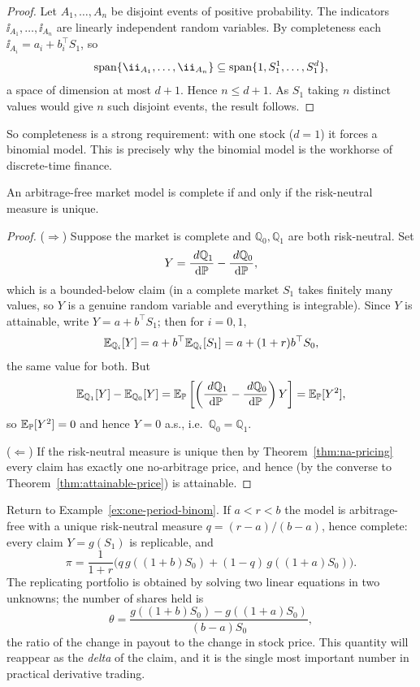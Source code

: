 \documentclass[a4paper]{scrartcl}
\newcommand{\QQ}{\mathbb{Q}}
\newcommand{\dP}{\mathrm{d}\PP}
\begin{document}
\begin{proof}
	Let $A_1,\dots,A_n$ be disjoint events of positive probability. The indicators $\ii_{A_1},\dots,\ii_{A_n}$ are linearly independent random variables. By completeness each $\ii_{A_i} = a_i + b_i^\top S_1$, so
	$$
	\vecspan\{\ii_{A_1},\dots,\ii_{A_n}\} \subseteq \vecspan\{1, S_1^1,\dots,S_1^d\},
	$$
	a space of dimension at most $d+1$. Hence $n \leq d+1$. As $S_1$ taking $n$ distinct values would give $n$ such disjoint events, the result follows.
\end{proof}

So completeness is a strong requirement: with one stock ($d=1$) it forces a binomial model. This is precisely why the binomial model is the workhorse of discrete-time finance.

\begin{theorem}\label{thm:ftap2}
	An arbitrage-free market model is complete if and only if the risk-neutral measure is unique.
\end{theorem}

\begin{proof}
	($\Rightarrow$) Suppose the market is complete and $\QQ_0, \QQ_1$ are both risk-neutral. Set
	$$
	Y = \frac{\dd\QQ_1}{\dP} - \frac{\dd\QQ_0}{\dP},
	$$
	which is a bounded-below claim (in a complete market $S_1$ takes finitely many values, so $Y$ is a genuine random variable and everything is integrable). Since $Y$ is attainable, write $Y = a + b^\top S_1$; then for $i = 0,1$,
	$$
	\EE_{\QQ_i}[Y] = a + b^\top\EE_{\QQ_i}[S_1] = a + (1+r)b^\top S_0,
	$$
	the same value for both. But
	$$
	\EE_{\QQ_1}[Y] - \EE_{\QQ_0}[Y] = \EE_\PP\left[\left(\frac{\dd \QQ_1}{\dP} - \frac{\dd\QQ_0}{\dP}\right)Y\right] = \EE_\PP[Y^2],
	$$
	so $\mathbb{E}_{\mathbb{P}}[Y^2] = 0$ and hence $Y = 0$ a.s., i.e.\ $\QQ_0 = \QQ_1$.

	($\Leftarrow$) If the risk-neutral measure is unique then by Theorem~\ref{thm:na-pricing} every claim has exactly one no-arbitrage price, and hence (by the converse to Theorem~\ref{thm:attainable-price}) is attainable.
\end{proof}

\begin{example}
	Return to Example~\ref{ex:one-period-binom}. If $a < r < b$ the model is arbitrage-free with a unique risk-neutral measure $q = (r-a)/(b-a)$, hence complete: every claim $Y = g(S_1)$ is replicable, and
	$$
	\pi = \frac{1}{1+r}\Big(q\,g((1+b)S_0) + (1-q)\,g((1+a)S_0)\Big).
	$$
	The replicating portfolio is obtained by solving two linear equations in two unknowns; the number of shares held is
	$$
	\theta = \frac{g((1+b)S_0) - g((1+a)S_0)}{(b-a)S_0},
	$$
	the ratio of the change in payout to the change in stock price. This quantity will reappear as the \emph{delta} of the claim, and it is the single most important number in practical derivative trading.
\end{example}
\end{document}
